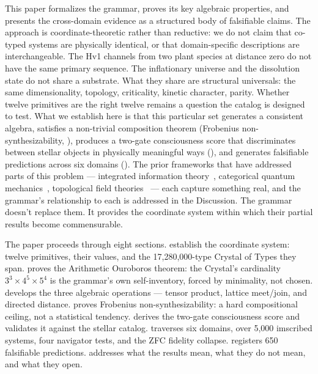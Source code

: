 \documentclass[12pt,a4paper]{article}
\makeatletter
\renewcommand{\_}{\ig@origunderscore\discretionary{}{}{}}
\makeatother
\begin{document}
This paper formalizes the grammar, proves its key algebraic properties,
and presents the cross-domain evidence as a structured body of
falsifiable claims. The approach is coordinate-theoretic rather than
reductive: we do not claim that co-typed systems are physically
identical, or that domain-specific descriptions are interchangeable.
The Hv1 channels from two plant species at distance zero do not have
the same primary sequence. The inflationary universe and the
dissolution state do not share a substrate. What they share are
structural universals: the same dimensionality, topology, criticality,
kinetic character, parity. Whether twelve primitives are the right
twelve remains a question the catalog is designed to test. What we
establish here is that this particular set generates a consistent
algebra, satisfies a non-trivial composition theorem (Frobenius
non-synthesizability, ), produces a two-gate
consciousness score that discriminates between stellar objects in
physically meaningful ways (), and generates
falsifiable predictions across six domains ().
The prior frameworks that have addressed parts of this problem ---
integrated information theory~\cite{tononi2004,tononi2016}, categorical
quantum mechanics~\cite{abramsky2004}, topological field
theories~\cite{atiyah1988} --- each capture something real, and the
grammar's relationship to each is addressed in the Discussion. The
grammar doesn't replace them. It provides the coordinate system within
which their partial results become commensurable.

The paper proceeds through eight sections.
 establish the coordinate system:
twelve primitives, their values, and the 17,280,000-type Crystal
of Types they span.  proves the Arithmetic
Ouroboros theorem: the Crystal's cardinality $3^3 \times 4^5
\times 5^4$ is the grammar's own self-inventory, forced by
minimality, not chosen.  develops the three
algebraic operations --- tensor product, lattice meet/join, and
directed distance.  proves Frobenius
non-synthesizability: a hard compositional ceiling, not a
statistical tendency.  derives the
two-gate consciousness score and validates it against the stellar
catalog.  traverses six domains, over 5,000
imscribed systems, four navigator tests, and the ZFC fidelity
collapse.  registers 650 falsifiable
predictions.  addresses what the results
mean, what they do not mean, and what they open.
\end{document}
